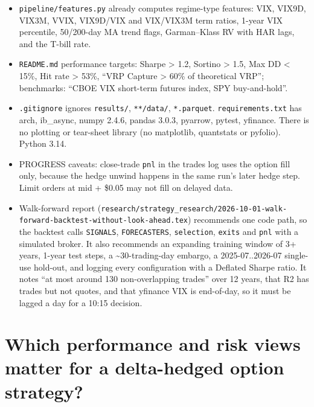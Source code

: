 \documentclass{article}
\begin{document}
\begin{itemize}
\item \texttt{pipeline/\allowbreak{}features.\allowbreak{}py} already computes regime-type features: VIX, VIX9D, VIX3M, VVIX, VIX9D/\allowbreak{}VIX and VIX/\allowbreak{}VIX3M term ratios, 1-year VIX percentile, 50/\allowbreak{}200-day MA trend flags, Garman--Klass RV with HAR lags, and the T-bill rate.

\item \texttt{README.\allowbreak{}md} performance targets: Sharpe > 1.2, Sortino > 1.5, Max DD < 15\%, Hit rate > 53\%, ``VRP Capture > 60\% of theoretical VRP''; benchmarks: ``CBOE VIX short-term futures index, SPY buy-and-hold''.

\item \texttt{.\allowbreak{}gitignore} ignores \texttt{results/\allowbreak{}}, \texttt{**/\allowbreak{}data/\allowbreak{}}, \texttt{*.\allowbreak{}parquet}. \texttt{requirements.\allowbreak{}txt} has arch, ib\_async, numpy 2.4.6, pandas 3.0.3, pyarrow, pytest, yfinance. There is no plotting or tear-sheet library (no matplotlib, quantstats or pyfolio). Python 3.14.

\item PROGRESS caveats: close-trade \texttt{pnl} in the trades log uses the option fill only, because the hedge unwind happens in the same run's later hedge step. Limit orders at mid + \$0.05 may not fill on delayed data.

\item Walk-forward report (\texttt{research/\allowbreak{}strategy\_\allowbreak{}research/\allowbreak{}2026-\allowbreak{}10-\allowbreak{}01-\allowbreak{}walk-\allowbreak{}forward-\allowbreak{}backtest-\allowbreak{}without-\allowbreak{}look-\allowbreak{}ahead.\allowbreak{}tex}) recommends one code path, so the backtest calls \texttt{SIGNALS}, \texttt{FORECASTERS}, \texttt{selection}, \texttt{exits} and \texttt{pnl} with a simulated broker. It also recommends an expanding training window of 3+ years, 1-year test steps, a \textasciitilde{}30-trading-day embargo, a 2025-07..2026-07 single-use hold-out, and logging every configuration with a Deflated Sharpe ratio. It notes ``at most around 130 non-overlapping trades'' over 12 years, that R2 has trades but not quotes, and that yfinance VIX is end-of-day, so it must be lagged a day for a 10:15 decision.

\end{itemize}

\section{Which performance and risk views matter for a delta-hedged option strategy?}
\end{document}
